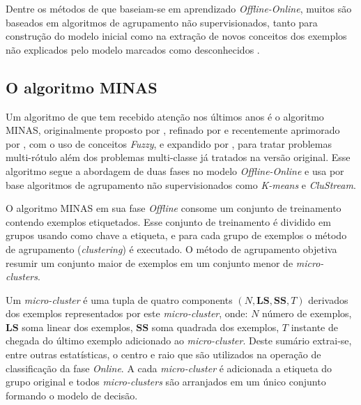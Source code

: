Dentre os métodos de \nd que baseiam-se em aprendizado \emph{Offline-Online},
muitos são baseados em algoritmos de agrupamento não supervisionados, tanto
para construção do modelo inicial como na extração de novos conceitos dos
exemplos não explicados pelo modelo marcados como desconhecidos
\cite{Spinosa2009ollinda,Masud2010ECSMiner,Faria2013}.

\subsection{O algoritmo MINAS}\label{sec:minas-og}

Um algoritmo de \nd que tem recebido atenção nos últimos anos é o algoritmo
MINAS, originalmente proposto por , refinado por
 e recentemente aprimorado por
, com o uso de conceitos \emph{Fuzzy}, e expandido por
, para tratar problemas multi-rótulo além dos problemas
multi-classe já tratados na versão original.
Esse algoritmo segue a abordagem de duas fases no modelo \emph{Offline-Online} e
usa por base algoritmos de agrupamento não supervisionados como \emph{K-means} e
\emph{CluStream}.

\newcommand{\mcluster}{\emph{micro-cluster}\xspace}
\newcommand{\mclusters}{\emph{micro-clusters}\xspace}

O algoritmo MINAS em sua fase \emph{Offline} consome um conjunto de treinamento
contendo exemplos etiquetados.
Esse conjunto de treinamento é dividido em grupos usando como chave a etiqueta,
e para cada grupo de exemplos o método de agrupamento (\emph{clustering}) é
executado.
O método de agrupamento objetiva resumir um conjunto maior de exemplos em um
conjunto menor de \mclusters.

Um \mcluster é uma tupla de quatro components $(N, \mathbf{LS}, \mathbf{SS}, T)$
derivados dos exemplos representados por este \mcluster, onde:
$N$ número de exemplos,
$\mathbf{LS}$ soma linear dos exemplos,
$\mathbf{SS}$ soma quadrada dos exemplos,
$T$ instante de chegada do último exemplo adicionado ao \mcluster.
Deste sumário extrai-se, entre outras estatísticas, o centro e raio que são
utilizados na operação de classificação da fase \emph{Online}.
A cada \mcluster é adicionada a etiqueta do grupo original e todos \mclusters
são arranjados em um único conjunto formando o modelo de decisão.

